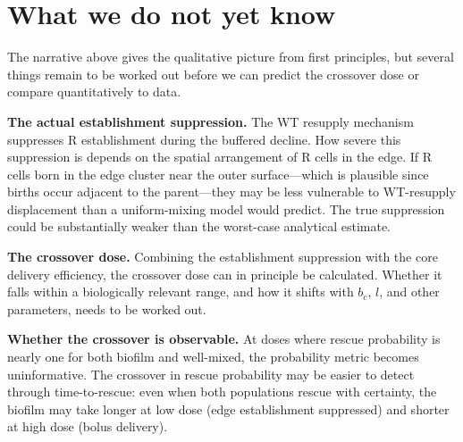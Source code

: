 \documentclass[12pt]{article}
\begin{document}
\section{What we do not yet know}

The narrative above gives the qualitative picture from first principles, but
several things remain to be worked out before we can predict the crossover
dose or compare quantitatively to data.

\textbf{The actual establishment suppression.} The WT resupply mechanism
suppresses R establishment during the buffered decline. How severe this
suppression is depends on the spatial arrangement of R cells in the edge.
If R cells born in the edge cluster near the outer surface---which is
plausible since births occur adjacent to the parent---they may be less
vulnerable to WT-resupply displacement than a uniform-mixing model would
predict. The true suppression could be substantially weaker than the
worst-case analytical estimate.

\textbf{The crossover dose.} Combining the establishment suppression with
the core delivery efficiency, the crossover dose can in principle be
calculated. Whether it falls within a biologically relevant range, and how
it shifts with $b_c$, $l$, and other parameters, needs to be worked out.

\textbf{Whether the crossover is observable.} At doses where rescue
probability is nearly one for both biofilm and well-mixed, the probability
metric becomes uninformative. The crossover in rescue probability may be
easier to detect through time-to-rescue: even when both populations
rescue with certainty, the biofilm may take longer at low dose (edge
establishment suppressed) and shorter at high dose (bolus delivery).
\end{document}
